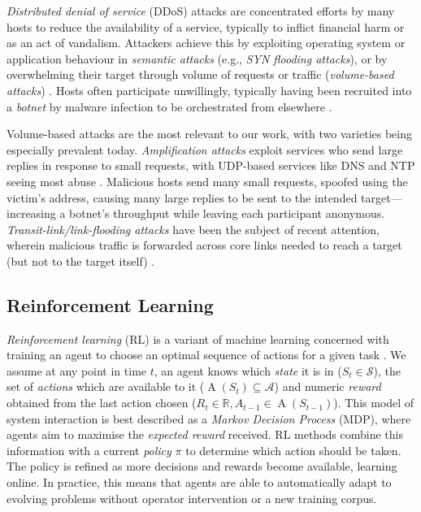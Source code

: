 \documentclass[10pt, times, conference, letterpaper]{IEEEtran}
\begin{document}

\emph{Distributed denial of service} (DDoS) attacks are concentrated efforts by many hosts to reduce the availability of a service, typically to inflict financial harm or as an act of vandalism.
Attackers achieve this by exploiting operating system or application behaviour in \emph{semantic attacks} (e.g., \emph{SYN flooding attacks}), or by overwhelming their target through volume of requests or traffic (\emph{volume-based attacks}) \cite{DBLP:conf/imc/JonkerKKRSD17}.
Hosts often participate unwillingly, typically having been recruited into a \emph{botnet} by malware infection to be orchestrated from elsewhere \cite{DBLP:conf/uss/AntonakakisABBB17}.

Volume-based attacks are the most relevant to our work, with two varieties being especially prevalent today.
\emph{Amplification attacks} exploit services who send large replies in response to small requests, with UDP-based services like DNS and NTP seeing most abuse \cite{DBLP:conf/ndss/Rossow14, DBLP:conf/uss/KuhrerHRH14}.
Malicious hosts send many small requests, spoofed using the victim's address, causing many large replies to be sent to the intended target---increasing a botnet's throughput while leaving each participant anonymous.
\emph{Transit-link/link-flooding attacks} have been the subject of recent attention, wherein malicious traffic is forwarded across core links needed to reach a target (but not to the target itself) \cite{DBLP:conf/sp/KangLG13, DBLP:conf/esorics/StuderP09}.

\subsection{Reinforcement Learning}\label{sec:reinforcement-learning}
\emph{Reinforcement learning} (RL) is a variant of machine learning concerned with training an agent to choose an optimal sequence of actions for a given task \cite{RL2E}.
We assume at any point in time $t$, an agent knows which \emph{state} it is in ($S_t \in \mathcal{S}$), the set of \emph{actions} which are available to it ($\operatorname{A}(S_t) \subseteq \mathcal{A}$) and numeric \emph{reward} obtained from the last action chosen ($R_t \in \mathbb{R}, A_{t-1} \in \operatorname{A}(S_{t-1})$).
This model of system interaction is best described as a \emph{Markov Decision Process} (MDP), where agents aim to maximise the \emph{expected reward} received.
RL methods combine this information with a current \emph{policy} $\pi$ to determine which action should be taken.
The policy is refined as more decisions and rewards become available, learning online.
In practice, this means that agents are able to automatically adapt to evolving problems without operator intervention or a new training corpus.
\end{document}
